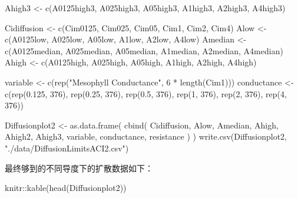 \documentclass[
]{krantz}
\makeatletter
\newenvironment{Shaded}{\begin{snugshade}}{\end{snugshade}}
\newcommand{\DecValTok}[1]{\textcolor[rgb]{0.00,0.00,0.81}{#1}}
\newcommand{\FloatTok}[1]{\textcolor[rgb]{0.00,0.00,0.81}{#1}}
\newcommand{\FunctionTok}[1]{\textcolor[rgb]{0.00,0.00,0.00}{#1}}
\newcommand{\NormalTok}[1]{#1}
\newcommand{\OtherTok}[1]{\textcolor[rgb]{0.56,0.35,0.01}{#1}}
\newcommand{\SpecialCharTok}[1]{\textcolor[rgb]{0.00,0.00,0.00}{#1}}
\newcommand{\StringTok}[1]{\textcolor[rgb]{0.31,0.60,0.02}{#1}}
\newenvironment{kframe}{%
\medskip{}
\setlength{\fboxsep}{.8em}
 \def\at@end@of@kframe{}%
 \ifinner\ifhmode%
  \def\at@end@of@kframe{\end{minipage}}%
  \begin{minipage}{\columnwidth}%
 \fi\fi%
 \def\FrameCommand##1{\hskip\@totalleftmargin \hskip-\fboxsep
 \colorbox{shadecolor}{##1}\hskip-\fboxsep
     \hskip-\linewidth \hskip-\@totalleftmargin \hskip\columnwidth}%
 \MakeFramed {\advance\hsize-\width
   \@totalleftmargin\z@ \linewidth\hsize
   \@setminipage}}%
 {\par\unskip\endMakeFramed%
 \at@end@of@kframe}
\renewenvironment{Shaded}{\begin{kframe}}{\end{kframe}}
\makeatother
\begin{document}
\begin{Shaded}
\begin{Highlighting}[]
\NormalTok{Ahigh3 }\OtherTok{\textless{}{-}}
  \FunctionTok{c}\NormalTok{(A0125high3, A025high3, A05high3, A1high3, A2high3, A4high3)}

\NormalTok{Cidiffusion }\OtherTok{\textless{}{-}} \FunctionTok{c}\NormalTok{(Cim0125, Cim025, Cim05, Cim1, Cim2, Cim4)}
\NormalTok{Alow }\OtherTok{\textless{}{-}} \FunctionTok{c}\NormalTok{(A0125low, A025low, A05low, A1low, A2low, A4low)}
\NormalTok{Amedian }\OtherTok{\textless{}{-}}
  \FunctionTok{c}\NormalTok{(A0125median,}
\NormalTok{    A025median,}
\NormalTok{    A05median,}
\NormalTok{    A1median,}
\NormalTok{    A2median,}
\NormalTok{    A4median)}
\NormalTok{Ahigh }\OtherTok{\textless{}{-}} \FunctionTok{c}\NormalTok{(A0125high, A025high, A05high, A1high, A2high, A4high)}

\NormalTok{variable }\OtherTok{\textless{}{-}} \FunctionTok{c}\NormalTok{(}\FunctionTok{rep}\NormalTok{(}\StringTok{"Mesophyll Conductance"}\NormalTok{, }\DecValTok{6} \SpecialCharTok{*} \FunctionTok{length}\NormalTok{(Cim1)))}
\NormalTok{conductance }\OtherTok{\textless{}{-}}
  \FunctionTok{c}\NormalTok{(}\FunctionTok{rep}\NormalTok{(}\FloatTok{0.125}\NormalTok{, }\DecValTok{376}\NormalTok{),}
    \FunctionTok{rep}\NormalTok{(}\FloatTok{0.25}\NormalTok{, }\DecValTok{376}\NormalTok{),}
    \FunctionTok{rep}\NormalTok{(}\FloatTok{0.5}\NormalTok{, }\DecValTok{376}\NormalTok{),}
    \FunctionTok{rep}\NormalTok{(}\DecValTok{1}\NormalTok{, }\DecValTok{376}\NormalTok{),}
    \FunctionTok{rep}\NormalTok{(}\DecValTok{2}\NormalTok{, }\DecValTok{376}\NormalTok{),}
    \FunctionTok{rep}\NormalTok{(}\DecValTok{4}\NormalTok{, }\DecValTok{376}\NormalTok{))}

\NormalTok{Diffusionplot2 }\OtherTok{\textless{}{-}}
  \FunctionTok{as.data.frame}\NormalTok{(}
    \FunctionTok{cbind}\NormalTok{(}
\NormalTok{      Cidiffusion,}
\NormalTok{      Alow,}
\NormalTok{      Amedian,}
\NormalTok{      Ahigh,}
\NormalTok{      Ahigh2,}
\NormalTok{      Ahigh3,}
\NormalTok{      variable,}
\NormalTok{      conductance,}
\NormalTok{      resistance}
\NormalTok{    )}
\NormalTok{  )}
\FunctionTok{write.csv}\NormalTok{(Diffusionplot2, }\StringTok{"./data/DiffusionLimitsACI2.csv"}\NormalTok{)}
\end{Highlighting}
\end{Shaded}

最终够到的不同导度下的扩散数据如下：

\begin{Shaded}
\begin{Highlighting}[]
\NormalTok{knitr}\SpecialCharTok{::}\FunctionTok{kable}\NormalTok{(}\FunctionTok{head}\NormalTok{(Diffusionplot2))}
\end{Highlighting}
\end{Shaded}
\end{document}

